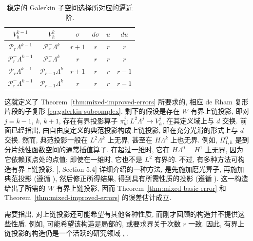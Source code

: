 \begin{table}[htbp]\centering
\caption{稳定的 Galerkin 子空间选择所对应的逼近阶.}\label{tab:galerkin-form-approximation-rates}
\begin{tabular}{cc|cccc}\hline
$V_h^{k-1}$&$V_h^k$&$\sigma$&$d\sigma$&$u$&$du$\\\hline
$\mathcal P_r\Lambda^{k-1}$&$\mathcal P_r^-\Lambda^k$&$r+1$&$r$&$r$&$r$\\
$\mathcal P_r^-\Lambda^{k-1}$&$\mathcal P_r^-\Lambda^k$&$r$&$r$&$r$&$r$\\
$\mathcal P_r\Lambda^{k-1}$&$\mathcal P_{r-1}\Lambda^k$&$r+1$&$r$&$r$&$r-1$\\
$\mathcal P_r^-\Lambda^{k-1}$&$\mathcal P_{r-1}\Lambda^k$&$r$&$r$&$r$&$r-1$\\\hline
\end{tabular}
\end{table}

这就定义了 Theorem~\ref{thm:mixed-improved-errors} 所要求的, 相应 de Rham 复形片段的子复形 \eqref{eq:galerkin-subcomplex}. 剩下的假设是存在 $W$-有界上链投影, 即对 $j=k-1$, $k$, $k+1$, 存在有界投影算子 $\pi_h^j:L^2\Lambda^j\to V_h^j$, 在其定义域上与 $d$ 交换. 前面已经指出, 由自由度定义的典范投影构成上链投影, 即在充分光滑的形式上与 $d$ 交换. 然而, 典范投影一般在 $L^2\Lambda^k$ 上无界, 甚至在 $H\Lambda^k$ 上也无界. 例如, $\Pi_{1,h}^0$ 是到分片线性函数空间的通常插值算子. 在超过一维时, 它在 $H\Lambda^0=H^1$ 上无界, 因为它依赖顶点处的点值; 即使在一维时, 它也不是 $L^2$ 有界的. 不过, 有多种方法可构造有界上链投影. [, Section 5.4] 详细介绍的一种方法, 是先施加磨光算子, 再施加典范投影 (遵循 ), 然后修正所得结果, 得到具有所需性质的投影 (遵循 ). 这一构造给出了所需的 $W$-有界上链投影, 因而 Theorem~\ref{thm:mixed-basic-error} 和 Theorem~\ref{thm:mixed-improved-errors} 的误差估计成立.

需要指出, 对上链投影还可能希望有其他各种性质, 而刚才回顾的构造并不提供这些性质. 例如, 可能希望该构造是局部的, 或要求界关于次数 $r$ 一致. 因此, 有界上链投影的构造仍是一个活跃的研究领域 , .
